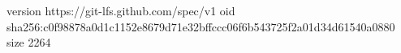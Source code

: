 version https://git-lfs.github.com/spec/v1
oid sha256:c0f98878a0d1c1152e8679d71e32bffccc06f6b543725f2a01d34d61540a0880
size 2264
